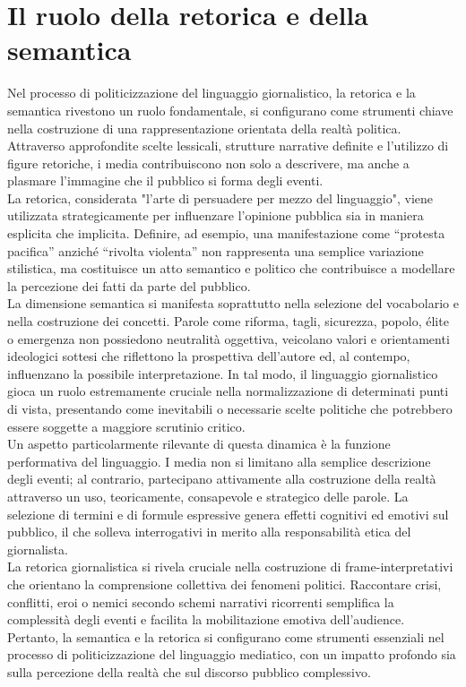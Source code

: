 \section{Il ruolo della retorica e della semantica}
Nel processo di politicizzazione del linguaggio giornalistico, la retorica e la semantica rivestono un ruolo fondamentale, si configurano come strumenti chiave nella costruzione di una rappresentazione orientata della realtà politica. Attraverso approfondite scelte lessicali, strutture narrative definite e l'utilizzo di figure retoriche, i media contribuiscono non solo a descrivere, ma anche a plasmare l'immagine che il pubblico si forma degli eventi. \\
La retorica, considerata "l'arte di persuadere per mezzo del linguaggio", viene utilizzata strategicamente per influenzare l'opinione pubblica sia in maniera esplicita che implicita. Definire, ad esempio, una manifestazione come “protesta pacifica” anziché “rivolta violenta” non rappresenta una semplice variazione stilistica, ma costituisce un atto semantico e politico che contribuisce a modellare la percezione dei fatti da parte del pubblico. \\
La dimensione semantica si manifesta soprattutto nella selezione del vocabolario e nella costruzione dei concetti. Parole come riforma, tagli, sicurezza, popolo, élite o emergenza non possiedono neutralità oggettiva, veicolano valori e orientamenti ideologici sottesi che riflettono la prospettiva dell’autore ed, al contempo, influenzano la possibile interpretazione. In tal modo, il linguaggio giornalistico gioca un ruolo estremamente cruciale nella normalizzazione di determinati punti di vista, presentando come inevitabili o necessarie scelte politiche che potrebbero essere soggette a maggiore scrutinio critico. \\
Un aspetto particolarmente rilevante di questa dinamica è la funzione performativa del linguaggio. I media non si limitano alla semplice descrizione degli eventi; al contrario, partecipano attivamente alla costruzione della realtà attraverso un uso, teoricamente, consapevole e strategico delle parole. La selezione di termini e di formule espressive genera effetti cognitivi ed emotivi sul pubblico, il che solleva interrogativi in merito alla responsabilità etica del giornalista. \\
La retorica giornalistica si rivela cruciale nella costruzione di \gls{frame-interpretativi} che orientano la comprensione collettiva dei fenomeni politici. Raccontare crisi, conflitti, eroi o nemici secondo schemi narrativi ricorrenti semplifica la complessità degli eventi e facilita la mobilitazione emotiva dell'audience. Pertanto, la semantica e la retorica si configurano come strumenti essenziali nel processo di politicizzazione del linguaggio mediatico, con un impatto profondo sia sulla percezione della realtà che sul discorso pubblico complessivo. \\